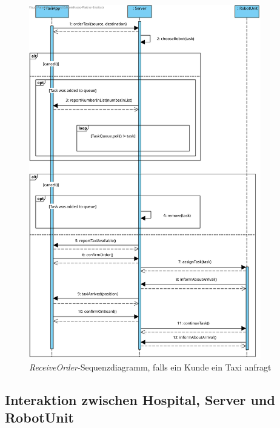 \begin{figure}[H]
	\centering
	\includegraphics[width=0.9\textwidth]{img/2-Entwurf-ReceiveOrder-Taxi}
	\caption{\emph{ReceiveOrder}-Sequenzdiagramm, falls ein Kunde ein Taxi anfragt}
	\label{SequenzDiagrammInteraktionTaxi}
\end{figure}

\subsection*{Interaktion zwischen Hospital, Server und RobotUnit}

